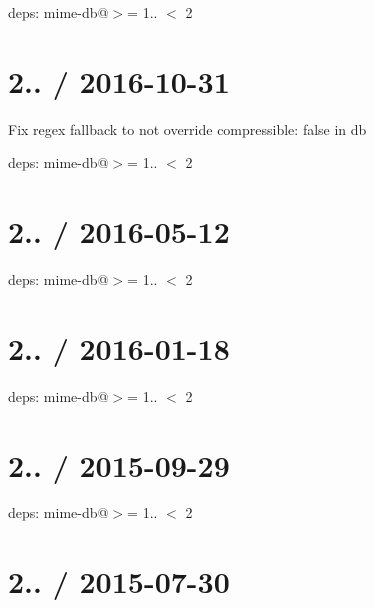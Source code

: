 
\begin{DoxyItemize}
\item deps\+: mime-\/db@\textquotesingle{}$>$= 1.. $<$ 2\textquotesingle{}
\end{DoxyItemize}

\section*{2.. / 2016-\/10-\/31 }


\begin{DoxyItemize}
\item Fix regex fallback to not override {\ttfamily compressible\+: false} in db
\item deps\+: mime-\/db@\textquotesingle{}$>$= 1.. $<$ 2\textquotesingle{}
\end{DoxyItemize}

\section*{2.. / 2016-\/05-\/12 }


\begin{DoxyItemize}
\item deps\+: mime-\/db@\textquotesingle{}$>$= 1.. $<$ 2\textquotesingle{}
\end{DoxyItemize}

\section*{2.. / 2016-\/01-\/18 }


\begin{DoxyItemize}
\item deps\+: mime-\/db@\textquotesingle{}$>$= 1.. $<$ 2\textquotesingle{}
\end{DoxyItemize}

\section*{2.. / 2015-\/09-\/29 }


\begin{DoxyItemize}
\item deps\+: mime-\/db@\textquotesingle{}$>$= 1.. $<$ 2\textquotesingle{}
\end{DoxyItemize}

\section*{2.. / 2015-\/07-\/30 }


